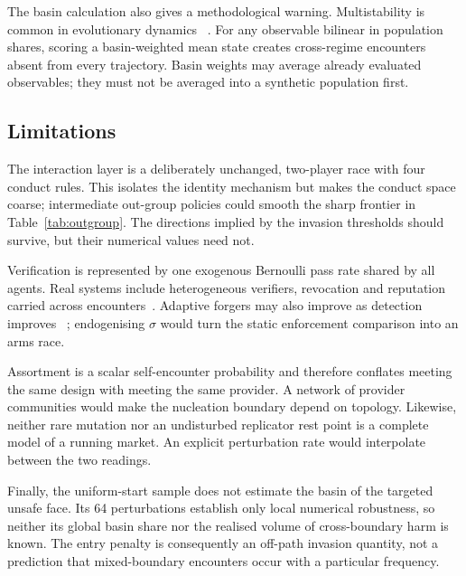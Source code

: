 The basin calculation also gives a methodological warning. Multistability is
common in evolutionary dynamics
~\citep{hofbauer1998evolutionary,hofbauer2003evolutionary,sandholm2010population}.
For any observable bilinear in population shares, scoring a basin-weighted
mean state creates cross-regime encounters absent from every trajectory. Basin
weights may average already evaluated observables; they must not be averaged
into a synthetic population first.

\subsection{Limitations}
\label{sec:limitations}

The interaction layer is a deliberately unchanged, two-player race with four
conduct rules. This isolates the identity mechanism but makes the conduct
space coarse; intermediate out-group policies could smooth the sharp frontier
in Table~\ref{tab:outgroup}. The directions implied by the invasion thresholds
should survive, but their numerical values need not.

Verification is represented by one exogenous Bernoulli pass rate shared by all
agents. Real systems include heterogeneous verifiers, revocation and
reputation carried across encounters~\citep{santos2018social,yue2025reputation}.
Adaptive forgers may also improve as detection improves
~\citep{jovanovic2024watermarkstealing}; endogenising $\sigma$ would turn the
static enforcement comparison into an arms race.

Assortment is a scalar self-encounter probability and therefore conflates
meeting the same design with meeting the same provider. A network of provider
communities would make the nucleation boundary depend on topology. Likewise,
neither rare mutation nor an undisturbed replicator rest point is a complete
model of a running market. An explicit perturbation rate would interpolate
between the two readings.

Finally, the uniform-start sample does not estimate the basin of the targeted
unsafe face. Its 64 perturbations establish only local numerical robustness,
so neither its global basin share nor the realised volume of cross-boundary
harm is known. The entry penalty is consequently an off-path invasion
quantity, not a prediction that mixed-boundary encounters occur with a
particular frequency.
